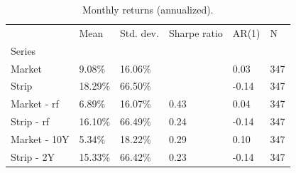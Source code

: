 \begin{table}
\caption{Monthly returns (annualized).}
\label{tab:table1}
\begin{tabular}{llllll}
\toprule
 & Mean & Std. dev. & Sharpe ratio & AR(1) & N \\
Series &  &  &  &  &  \\
\midrule
Market & 9.08\% & 16.06\% &  & 0.03 & 347 \\
Strip & 18.29\% & 66.50\% &  & -0.14 & 347 \\
Market - rf & 6.89\% & 16.07\% & 0.43 & 0.04 & 347 \\
Strip - rf & 16.10\% & 66.49\% & 0.24 & -0.14 & 347 \\
Market - 10Y & 5.34\% & 18.22\% & 0.29 & 0.10 & 347 \\
Strip - 2Y & 15.33\% & 66.42\% & 0.23 & -0.14 & 347 \\
\bottomrule
\end{tabular}
\end{table}
